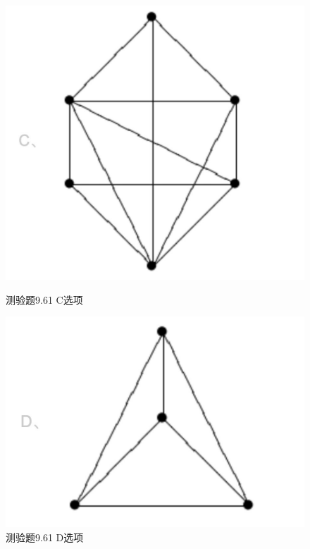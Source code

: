 \documentclass[UTF8, heading=true]{ctexart}
\begin{document}
\begin{figure}[htbp]
    \centering
    \begin{minipage}[t]{0.35\textwidth}
        \centering
        \includegraphics[width=1\textwidth]{9.61_3.jpg} %
	      \vspace{-0.3cm}
        \caption{测验题9.61 C选项}
    \end{minipage}
	  \hspace{0.1\textwidth} %
    \begin{minipage}[t]{0.35\textwidth}
        \centering
        \includegraphics[width=1\textwidth]{9.61_4.jpg} %
	      \vspace{-0.3cm}
        \caption{测验题9.61 D选项}
\end{minipage}
\end{figure}
\end{document}
